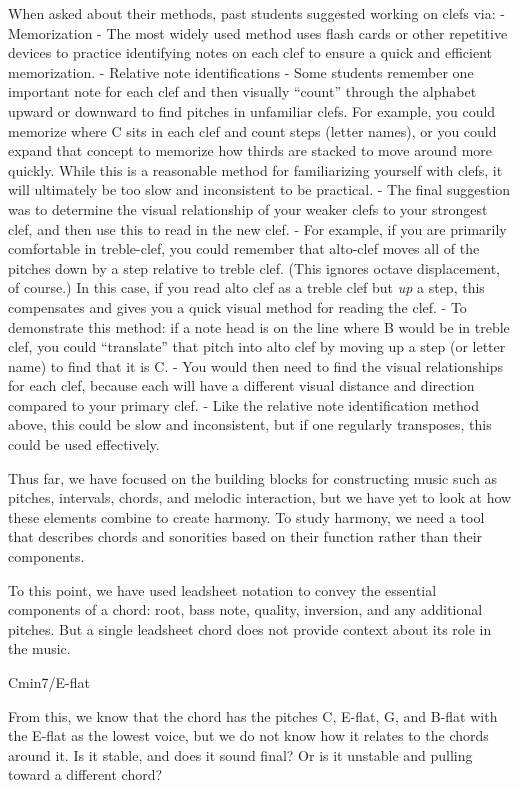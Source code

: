 \documentclass{book}
\begin{document}
When asked about their methods, past students suggested working on clefs via:
- Memorization - The most widely used method uses flash cards or other
repetitive devices to practice identifying notes on each clef to ensure a
quick and efficient memorization. - Relative note identifications - Some
students remember one important note for each clef and then visually ``count''
through the alphabet upward or downward to find pitches in unfamiliar clefs.
For example, you could memorize where C sits in each clef and count steps
(letter names), or you could expand that concept to memorize how thirds are
stacked to move around more quickly. While this is a reasonable method for
familiarizing yourself with clefs, it will ultimately be too slow and
inconsistent to be practical. - The final suggestion was to determine the
visual relationship of your weaker clefs to your strongest clef, and then use
this to read in the new clef. - For example, if you are primarily comfortable
in treble-clef, you could remember that alto-clef moves all of the pitches
down by a step relative to treble clef. (This ignores octave displacement, of
course.) In this case, if you read alto clef as a treble clef but \emph{up} a
step, this compensates and gives you a quick visual method for reading the
clef. - To demonstrate this method: if a note head is on the line where B
would be in treble clef, you could ``translate'' that pitch into alto clef by
moving up a step (or letter name) to find that it is C. - You would then need
to find the visual relationships for each clef, because each will have a
different visual distance and direction compared to your primary clef. - Like
the relative note identification method above, this could be slow and
inconsistent, but if one regularly transposes, this could be used effectively.

Thus far, we have focused on the building blocks for constructing music such
as pitches, intervals, chords, and melodic interaction, but we have yet to
look at how these elements combine to create harmony. To study harmony, we
need a tool that describes chords and sonorities based on their function
rather than their components.

To this point, we have used leadsheet notation to convey the essential
components of a chord: root, bass note, quality, inversion, and any additional
pitches. But a single leadsheet chord does not provide context about its role
in the music.

Cmin7/E-flat

From this, we know that the chord has the pitches C, E-flat, G, and B-flat
with the E-flat as the lowest voice, but we do not know how it relates to the
chords around it. Is it stable, and does it sound final? Or is it unstable and
pulling toward a different chord?
\end{document}
